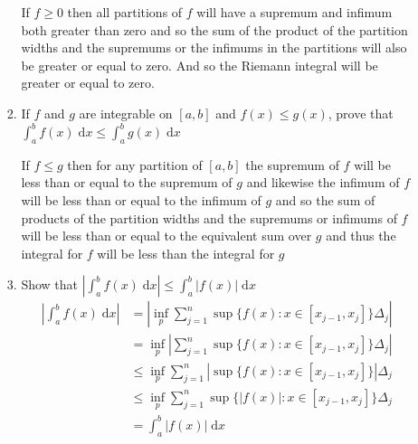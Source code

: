 \documentclass[letterpaper]{article}
\begin{document}
\begin{enumerate}
\begin{enumerate}
\begin{enumerate}
    If $f\ge 0$ then all partitions of $f$ will have a supremum and infimum both greater than zero and so the sum of the product of the partition widths and the supremums or the infimums in the partitions will also be greater or equal to zero. And so the Riemann integral will be greater or equal to zero.
    \item
    If $f$ and $g$ are integrable on $[a,b]$ and $f(x)\le g(x)$, prove that $\int_a^b{f(x)\;\mathrm{d}x}\le\int_a^b{g(x)\;\mathrm{d}x}$

    If $f\le g$ then for any partition of $[a,b]$ the supremum of $f$ will be less than or equal to the supremum of  $g$ and likewise the infimum of $f$ will be less than or equal to the infimum of $g$ and so the sum of products of the partition widths and the supremums or infimums of $f$ will be less than or equal to the equivalent sum over $g$ and thus the integral for $f$ will be less than the integral for $g$
    \item
    Show that $\left\lvert\int_a^b{f(x)\;\mathrm{d}x}\right\rvert\le \int_a^b{\left\lvert f(x)\right\rvert\;\mathrm{d}x}$
    \begin{align*}
      \left\lvert\int_a^b{f(x)\;\mathrm{d}x}\right\rvert&=\left\lvert{\inf}_p\sum\limits_{j=1}^n{\sup\{f(x):x\in[x_{j-1},x_j]\}\Delta_j}\right\rvert\\
      &={\inf}_p\left\lvert\sum\limits_{j=1}^n{\sup\{f(x):x\in[x_{j-1},x_j]\}\Delta_j}\right\rvert\\
      &\le{\inf}_p\sum\limits_{j=1}^n{\left\lvert\sup\{f(x):x\in[x_{j-1},x_j]\}\right\rvert\Delta_j}\\
      &\le{\inf}_p\sum\limits_{j=1}^n{\sup\{\left\lvert f(x)\right\rvert:x\in[x_{j-1},x_j]\}\Delta_j}\\
      &=\int_a^b{|f(x)|\;\mathrm{d}x}
    \end{align*}
    
    \end{enumerate}
  \end{enumerate}
\end{enumerate}
\end{document}
